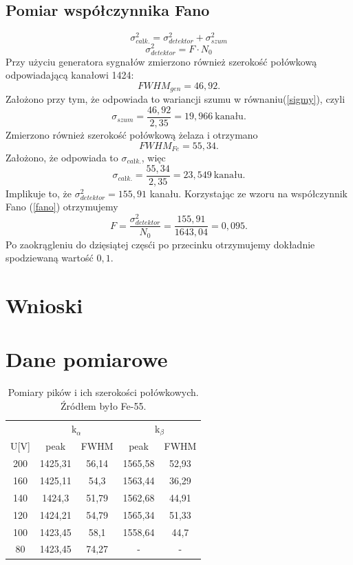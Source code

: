 \documentclass[11pt,a4paper]{article}
\begin{document}
\subsection{Pomiar współczynnika Fano}
\begin{equation}
	\sigma_{całk.}^2 = \sigma_{detektor}^2 + \sigma_{szum}^2
	\label{sigmy}
\end{equation}
\begin{equation}
	\sigma_{detektor}^2 = F\cdot N_0
	\label{fano}
\end{equation}
Przy użyciu generatora sygnałów zmierzono również szerokość połówkową odpowiadającą kanałowi 1424:
$$FWHM_{gen} = 46,92.$$
Założono przy tym, że odpowiada to wariancji szumu w równaniu(\ref{sigmy}), czyli
$$\sigma_{szum} = \frac{46,92}{2,35} = 19,966~ \text{kanału}. $$
Zmierzono również szerokość połówkową żelaza i otrzymano
$$FWHM_{Fe} = 55,34.$$
Założono, że odpowiada to $\sigma_{całk.}$, więc
$$\sigma_{całk.} = \frac{55,34}{2,35} = 23,549~ \text{kanału}.$$
Implikuje to, że $\sigma_{detektor}^2 = 155,91$ kanału.
Korzystając ze wzoru na współczynnik Fano (\ref{fano}) otrzymujemy
$$ F = \frac{\sigma_{detektor}^2}{N_0} = \frac{155,91}{1643,04} = 0,095.$$
Po zaokrągleniu do dzięsiątej częsći po przecinku otrzymujemy dokładnie spodziewaną wartość $0,1$.
\section{Wnioski}

\section{Dane pomiarowe}

\begin{longtable}{c|cc|cc}
	\caption{Pomiary pików i ich szerokości połówkowych. Źródłem było Fe-55.}\\
\label{dt2}
 &\multicolumn{2}{c|}{k$_{\alpha}$}	&\multicolumn{2}{c}{k$_{\beta}$} \\
U[V]	&peak	&FWHM	&peak	&FWHM\\ \hline
\endhead
200	&1425,31	&56,14	&1565,58	&52,93 \\
160	&1425,11	&54,3	&1563,44	&36,29 \\
140	&1424,3		&51,79	&1562,68	&44,91 \\
120	&1424,21	&54,79	&1565,34	&51,33 \\
100	&1423,45	&58,1	&1558,64	&44,7 \\
80	&1423,45	&74,27	&-	&- \\
\end{longtable}
\end{document}
